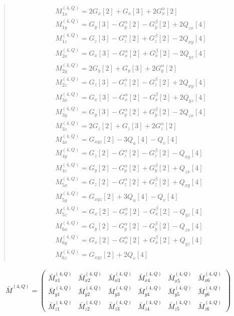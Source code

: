 \documentclass[fleqn,10pt]{jsarticle}
\begin{document}
\begin{quote}
\begin{align*}
& M^{(4,Q)}_{1x} = 2 G_{x}[2] + G_{x}[3] + 2 G_{x}^{\alpha}[2] \\
& M^{(4,Q)}_{1y} = G_{y}[3] - G_{y}^{\alpha}[2] - G_{y}^{\beta}[2] + 2 Q_{zx}[4] \\
& M^{(4,Q)}_{1z} = G_{z}[3] - G_{z}^{\alpha}[2] + G_{z}^{\beta}[2] - 2 Q_{xy}[4] \\
& M^{(4,Q)}_{2x} = G_{x}[3] - G_{x}^{\alpha}[2] + G_{x}^{\beta}[2] - 2 Q_{yz}[4] \\
& M^{(4,Q)}_{2y} = 2 G_{y}[2] + G_{y}[3] + 2 G_{y}^{\alpha}[2] \\
& M^{(4,Q)}_{2z} = G_{z}[3] - G_{z}^{\alpha}[2] - G_{z}^{\beta}[2] + 2 Q_{xy}[4] \\
& M^{(4,Q)}_{3x} = G_{x}[3] - G_{x}^{\alpha}[2] - G_{x}^{\beta}[2] + 2 Q_{yz}[4] \\
& M^{(4,Q)}_{3y} = G_{y}[3] - G_{y}^{\alpha}[2] + G_{y}^{\beta}[2] - 2 Q_{zx}[4] \\
& M^{(4,Q)}_{3z} = 2 G_{z}[2] + G_{z}[3] + 2 G_{z}^{\alpha}[2] \\
& M^{(4,Q)}_{4x} = G_{xyz}[2] - 3 Q_{u}[4] - Q_{v}[4] \\
& M^{(4,Q)}_{4y} = G_{z}[2] - G_{z}^{\alpha}[2] - G_{z}^{\beta}[2] - Q_{xy}[4] \\
& M^{(4,Q)}_{4z} = G_{y}[2] - G_{y}^{\alpha}[2] + G_{y}^{\beta}[2] + Q_{zx}[4] \\
& M^{(4,Q)}_{5x} = G_{z}[2] - G_{z}^{\alpha}[2] + G_{z}^{\beta}[2] + Q_{xy}[4] \\
& M^{(4,Q)}_{5y} = G_{xyz}[2] + 3 Q_{u}[4] - Q_{v}[4] \\
& M^{(4,Q)}_{5z} = G_{x}[2] - G_{x}^{\alpha}[2] - G_{x}^{\beta}[2] - Q_{yz}[4] \\
& M^{(4,Q)}_{6x} = G_{y}[2] - G_{y}^{\alpha}[2] - G_{y}^{\beta}[2] - Q_{zx}[4] \\
& M^{(4,Q)}_{6y} = G_{x}[2] - G_{x}^{\alpha}[2] + G_{x}^{\beta}[2] + Q_{yz}[4] \\
& M^{(4,Q)}_{6z} = G_{xyz}[2] + 2 Q_{v}[4]
\end{align*}
\end{quote}
\begin{align*}
\bar{M}^{(4,Q)} = \begin{pmatrix} \bar{M}^{(4,Q)}_{x1} & \bar{M}^{(4,Q)}_{x2} & \bar{M}^{(4,Q)}_{x3} & \bar{M}^{(4,Q)}_{x4} & \bar{M}^{(4,Q)}_{x5} & \bar{M}^{(4,Q)}_{x6} \\ \bar{M}^{(4,Q)}_{y1} & \bar{M}^{(4,Q)}_{y2} & \bar{M}^{(4,Q)}_{y3} & \bar{M}^{(4,Q)}_{y4} & \bar{M}^{(4,Q)}_{y5} & \bar{M}^{(4,Q)}_{y6} \\ \bar{M}^{(4,Q)}_{z1} & \bar{M}^{(4,Q)}_{z2} & \bar{M}^{(4,Q)}_{z3} & \bar{M}^{(4,Q)}_{z4} & \bar{M}^{(4,Q)}_{z5} & \bar{M}^{(4,Q)}_{z6} \end{pmatrix}
\end{align*}
\end{document}
